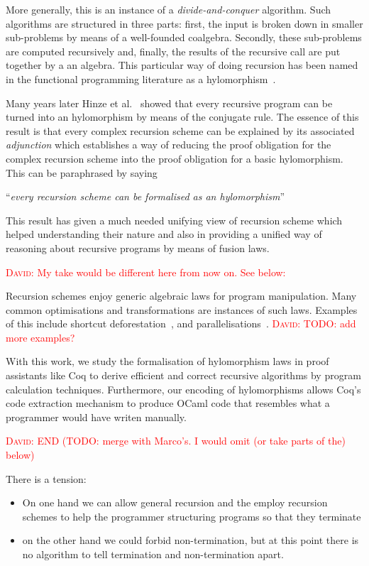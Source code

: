 \documentclass[a4paper, UKenglish, cleveref, autoref, thm-restate]{lipics-v2021}
\newcommand{\dcas}[1]{\textcolor{red}{\textsc{David}: #1}}
\begin{document}
More generally, this is an instance of a \emph{divide-and-conquer} algorithm.
Such algorithms are structured in three parts: first, the input is broken down
in smaller sub-problems by means of a well-founded coalgebra. Secondly, these
sub-problems are computed recursively and, finally, the results of the recursive
call are put together by a an algebra. This particular way of doing recursion
has been named in the functional programming literature as a
hylomorphism~\cite{MeijerFP91, HuIT96}.

Many years later Hinze et al.~\cite{HinzeWG15} showed that every recursive
program can be turned into an hylomorphism by means of the conjugate rule. The
essence of this result is that every complex recursion scheme can be explained
by its associated \emph{adjunction} which establishes a way of reducing the
proof obligation for the complex recursion scheme into the proof obligation for
a basic hylomorphism. This can be paraphrased by saying
\begin{center}
  ``\emph{every recursion scheme can be formalised as an hylomorphism}''
\end{center}

This result has given a much needed unifying view of recursion scheme which
helped understanding their nature and also in providing a unified way of
reasoning about recursive programs by means of fusion laws.

\dcas{My take would be different here from now on. See below:}

Recursion schemes enjoy generic algebraic laws for program manipulation. Many
common optimisations and transformations are instances of such laws. Examples of
this include shortcut deforestation~\cite{TakanoM95}, and
parallelisations~\cite{Gibbons96:Third}. \dcas{TODO: add more examples?}

With this work, we study the formalisation of hylomorphism laws in proof
assistants like Coq to derive efficient and correct recursive algorithms by
program calculation techniques. Furthermore, our encoding of hylomorphisms
allows Coq's code extraction mechanism to produce OCaml code that resembles what
a programmer would have writen manually.

\dcas{END (TODO: merge with Marco's. I would omit (or take parts of the) below)}

There is a tension:
\begin{itemize}
  \item On one hand we can allow general recursion and the employ recursion
schemes to help the programmer structuring programs so that they terminate
  \item on the other hand we could forbid non-termination, but at this point
there is no algorithm to tell termination and non-termination apart.
\end{itemize}
\end{document}
